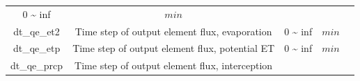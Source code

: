 \documentclass[]{scrbook}
\begin{document}
\begin{longtable}[]{@{}ccccc@{}}
\begin{minipage}[t]{0.10\columnwidth}
0 \textasciitilde{} inf\strut
\end{minipage} & \begin{minipage}[t]{0.10\columnwidth}\centering\strut
\(min\)\strut
\end{minipage} & \begin{minipage}[t]{0.26\columnwidth}\centering\strut
\strut
\end{minipage}\tabularnewline
\begin{minipage}[t]{0.17\columnwidth}\centering\strut
dt\_qe\_et2\strut
\end{minipage} & \begin{minipage}[t]{0.23\columnwidth}\centering\strut
Time step of output element flux, evaporation\strut
\end{minipage} & \begin{minipage}[t]{0.10\columnwidth}\centering\strut
0 \textasciitilde{} inf\strut
\end{minipage} & \begin{minipage}[t]{0.10\columnwidth}\centering\strut
\(min\)\strut
\end{minipage} & \begin{minipage}[t]{0.26\columnwidth}\centering\strut
\strut
\end{minipage}\tabularnewline
\begin{minipage}[t]{0.17\columnwidth}\centering\strut
dt\_qe\_etp\strut
\end{minipage} & \begin{minipage}[t]{0.23\columnwidth}\centering\strut
Time step of output element flux, potential ET\strut
\end{minipage} & \begin{minipage}[t]{0.10\columnwidth}\centering\strut
0 \textasciitilde{} inf\strut
\end{minipage} & \begin{minipage}[t]{0.10\columnwidth}\centering\strut
\(min\)\strut
\end{minipage} & \begin{minipage}[t]{0.26\columnwidth}\centering\strut
\strut
\end{minipage}\tabularnewline
\begin{minipage}[t]{0.17\columnwidth}\centering\strut
dt\_qe\_prcp\strut
\end{minipage} & \begin{minipage}[t]{0.23\columnwidth}\centering\strut
Time step of output element flux, interception\strut
\end{minipage} & \begin{minipage}[t]{0.10\columnwidth}\centering\strut

\end{minipage}
\end{longtable}
\end{document}
